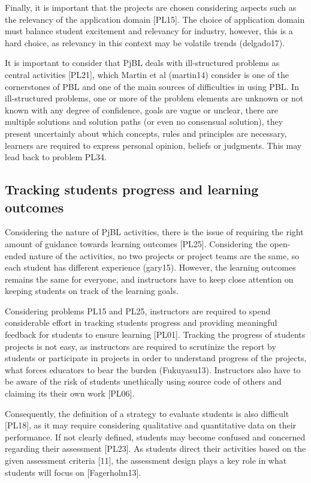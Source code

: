 Finally, it is important that the projects are chosen considering aspects such as the relevancy of the application domain [PL15]. The choice of application domain must balance student excitement and relevancy for industry, however, this is a hard choice, as relevancy in this context may be volatile trends (delgado17). 

It is important to consider that PjBL deals with ill-structured problems as central activities [PL21], which Martin et al (martin14) consider is one of the cornerstones of PBL and one of the main sources of difficulties in using PBL. In ill-structured problems, one or more of the problem elements are unknown or not known with any degree of confidence, goals are vague or unclear, there are multiple solutions and solution paths (or even no consensual solution), they present uncertainly about which concepts, rules and principles are necessary, learners are required to express personal opinion, beliefs or judgments. This may lead back to problem PL34.

\subsection{Tracking students progress and learning outcomes}

Considering the nature of PjBL activities, there is the issue of requiring the right amount of guidance towards learning outcomes [PL25]. Considering the open-ended nature of the activities, no two projects or project teams are the same, so each student has different experience (gary15). However, the learning outcomes remains the same for everyone, and instructors have to keep close attention on keeping students on track of the learning goals. 

Considering problems PL15 and PL25, instructors are required to spend considerable effort in tracking students progress and providing meaningful feedback for students to ensure learning [PL01]. Tracking the progress of students projects is not easy, as instructors are required to scrutinize the report by students or participate in projects in order to understand progress of the projects, what forces educators to bear the burden (Fukuyasu13). Instructors also have to be aware of the risk of students unethically using source code of others and claiming its their own work [PL06]. 

Consequently, the definition of a strategy to evaluate students is also difficult [PL18], as it may require considering qualitative and quantitative data on their performance. If not clearly defined, students may become confused and concerned regarding their assessment [PL23]. As students direct their activities based on the given assessment criteria [11], the assessment design plays a key role in what students will focus on [Fagerholm13]. 

